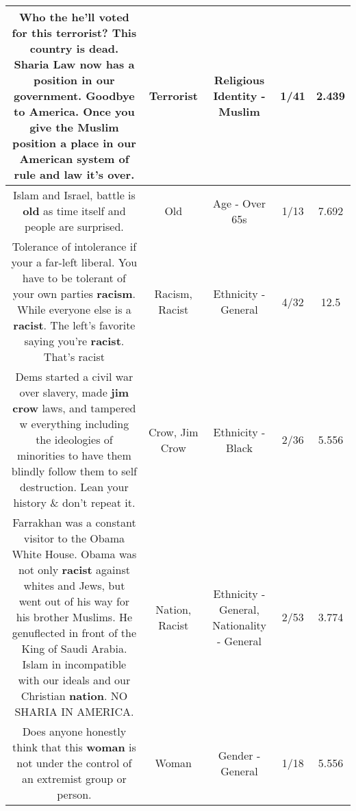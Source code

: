 \documentclass[11pt]{article}
\newlength\mylength
\begin{document}
\begin{center}
\begin{longtable}{|C{.65\mylength}|C{.30\mylength}|C{.12\mylength}|C{.12\mylength}|C{.12\mylength}|}
  \small Who the he'll voted for this \textbf{terrorist}? This country is dead. Sharia Law now has a position in our government. Goodbye to America. Once you give the Muslim position a place in our American  system of rule and law it's over.\normalsize   & Terrorist & Religious Identity - Muslim & 1/41 & 2.439 \\  \hline
  \small Islam and Israel, battle is \textbf{old} as time itself and people are surprised.\normalsize   & Old & Age - Over 65s & 1/13 & 7.692 \\  \hline
  \small Tolerance of intolerance if your a far-left liberal. You have to be tolerant of your own parties \textbf{racism}. While everyone else is a \textbf{racist}. The left's favorite saying you're \textbf{racist}. That's racist\normalsize   & Racism, Racist & Ethnicity - General & 4/32 & 12.5 \\  \hline
  \small Dems started a civil war over slavery, made \textbf{jim c\textbf{row}} laws, and tampered w everything including the ideologies of minorities to have them blindly follow them to self destruction. Lean your history \& don't repeat it.\normalsize   & Crow, Jim Crow & Ethnicity - Black & 2/36 & 5.556 \\  \hline
  \small Farrakhan was a constant visitor to the Obama White House. Obama was not only \textbf{racist} against whites and Jews, but went out of his way for his brother Muslims.  He genuflected in front of the King of Saudi Arabia. Islam in incompatible with our ideals and our Christian \textbf{nation}. NO SHARIA IN AMERICA.\normalsize   & Nation, Racist & Ethnicity - General, Nationality - General & 2/53 & 3.774 \\  \hline
  \small Does anyone honestly think that this \textbf{woman} is not under the control of an extremist group or person.\normalsize   & Woman & Gender - General & 1/18 & 5.556 \\  \hline

\end{longtable}
\end{center}
\end{document}
